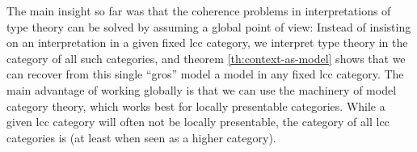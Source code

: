 \documentclass{article}
\theoremstyle{remark}
\theoremstyle{definition}
\begin{document}
The main insight so far was that the coherence problems in interpretations of type theory can be solved by assuming a global point of view:
Instead of insisting on an interpretation in a given fixed lcc category, we interpret type theory in the category of all such categories, and theorem \ref{th:context-as-model} shows that we can recover from this single ``gros'' model a model in any fixed lcc category.
The main advantage of working globally is that we can use the machinery of model category theory, which works best for locally presentable categories.
While a given lcc category will often not be locally presentable, the category of all lcc categories is (at least when seen as a higher category).




\end{document}
